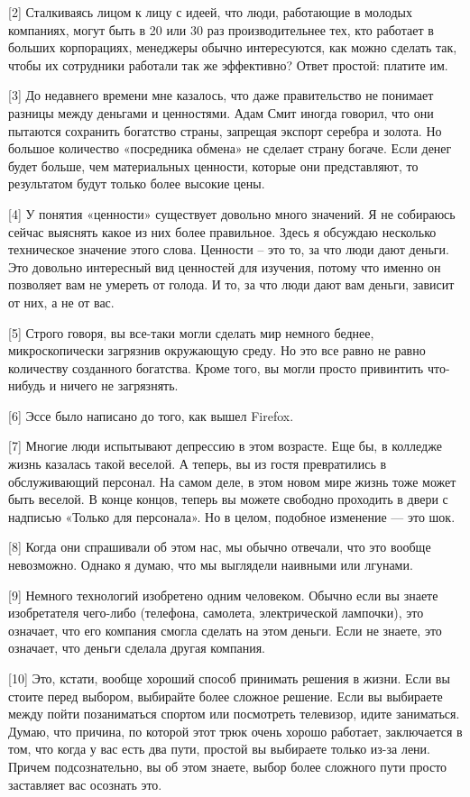 \documentclass[ebook,12pt,oneside,openany]{memoir}
\begin{document}
[2] Сталкиваясь лицом к лицу с идеей, что люди, работающие в молодых
компаниях, могут быть в 20 или 30 раз производительнее тех, кто
работает в больших корпорациях, менеджеры обычно интересуются, как
можно сделать так, чтобы их сотрудники работали так же эффективно?
Ответ простой: платите им.

[3] До недавнего времени мне казалось, что даже правительство не
понимает разницы между деньгами и ценностями. Адам Смит иногда
говорил, что они пытаются сохранить богатство страны, запрещая экспорт
серебра и золота. Но большое количество «посредника обмена» не сделает
страну богаче. Если денег будет больше, чем материальных ценности,
которые они представляют, то результатом будут только более высокие
цены.

[4] У понятия «ценности» существует довольно много значений. Я не
собираюсь сейчас выяснять какое из них более правильное. Здесь я
обсуждаю несколько техническое значение этого слова. Ценности – это
то, за что люди дают деньги. Это довольно интересный вид ценностей для
изучения, потому что именно он позволяет вам не умереть от голода. И
то, за что люди дают вам деньги, зависит от них, а не от вас.

[5] Строго говоря, вы все-таки могли сделать мир немного беднее,
микроскопически загрязнив окружающую среду. Но это все равно не равно
количеству созданного богатства. Кроме того, вы могли просто
привинтить что-нибудь и ничего не загрязнять.

[6] Эссе было написано до того, как вышел Firefox.

[7] Многие люди испытывают депрессию в этом возрасте. Еще бы, в
колледже жизнь казалась такой веселой. А теперь, вы из гостя
превратились в обслуживающий персонал. На самом деле, в этом новом
мире жизнь тоже может быть веселой. В конце концов, теперь вы можете
свободно проходить в двери с надписью «Только для персонала». Но в
целом, подобное изменение — это шок.

[8] Когда они спрашивали об этом нас, мы обычно отвечали, что это
вообще невозможно. Однако я думаю, что мы выглядели наивными или
лгунами.

[9] Немного технологий изобретено одним человеком. Обычно если вы
знаете изобретателя чего-либо (телефона, самолета, электрической
лампочки), это означает, что его компания смогла сделать на этом
деньги. Если не знаете, это означает, что деньги сделала другая
компания.

[10] Это, кстати, вообще хороший способ принимать решения в жизни.
Если вы стоите перед выбором, выбирайте более сложное решение. Если вы
выбираете между пойти позаниматься спортом или посмотреть телевизор,
идите заниматься. Думаю, что причина, по которой этот трюк очень
хорошо работает, заключается в том, что когда у вас есть два пути,
простой вы выбираете только из-за лени. Причем подсознательно, вы об
этом знаете, выбор более сложного пути просто заставляет вас осознать
это.
\end{document}
